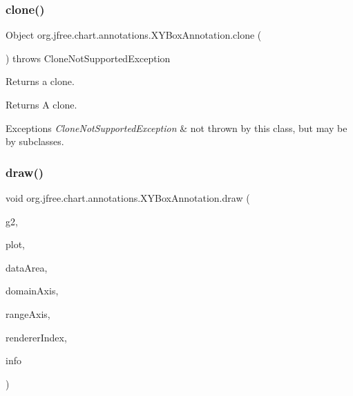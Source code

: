 \subsubsection{\texorpdfstring{clone()}{clone()}}
{\footnotesize\ttfamily Object org.\+jfree.\+chart.\+annotations.\+X\+Y\+Box\+Annotation.\+clone (\begin{DoxyParamCaption}{ }\end{DoxyParamCaption}) throws Clone\+Not\+Supported\+Exception}

Returns a clone.

\begin{DoxyReturn}{Returns}
A clone.
\end{DoxyReturn}

\begin{DoxyExceptions}{Exceptions}
{\em Clone\+Not\+Supported\+Exception} & not thrown by this class, but may be by subclasses. \\
\hline
\end{DoxyExceptions}
\mbox{\label{classorg_1_1jfree_1_1chart_1_1annotations_1_1_x_y_box_annotation_acb8fab482131052fe874c8d3c5226ebc}} 
\subsubsection{\texorpdfstring{draw()}{draw()}}
{\footnotesize\ttfamily void org.\+jfree.\+chart.\+annotations.\+X\+Y\+Box\+Annotation.\+draw (\begin{DoxyParamCaption}\item[{Graphics2D}]{g2,  }\item[{\mbox{\hyperlink{classorg_1_1jfree_1_1chart_1_1plot_1_1_x_y_plot}{X\+Y\+Plot}}}]{plot,  }\item[{Rectangle2D}]{data\+Area,  }\item[{\mbox{\hyperlink{classorg_1_1jfree_1_1chart_1_1axis_1_1_value_axis}{Value\+Axis}}}]{domain\+Axis,  }\item[{\mbox{\hyperlink{classorg_1_1jfree_1_1chart_1_1axis_1_1_value_axis}{Value\+Axis}}}]{range\+Axis,  }\item[{int}]{renderer\+Index,  }\item[{\mbox{\hyperlink{classorg_1_1jfree_1_1chart_1_1plot_1_1_plot_rendering_info}{Plot\+Rendering\+Info}}}]{info }\end{DoxyParamCaption})}

